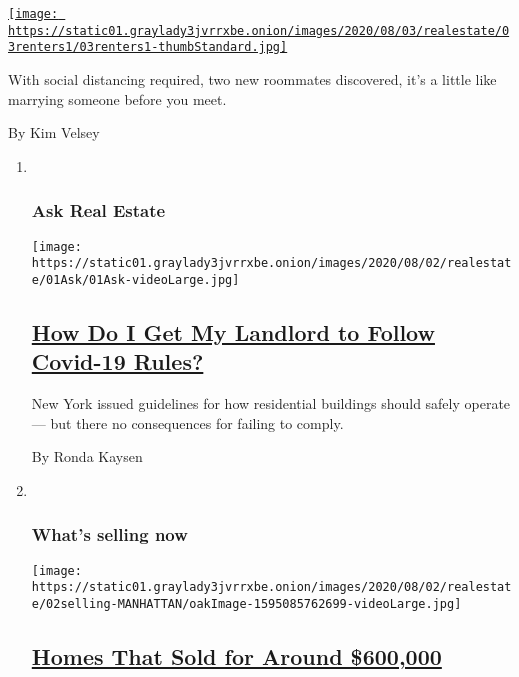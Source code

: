 \begin{enumerate}
\begin{enumerate}
    \href{/2020/08/03/realestate/coronavirus-roommate-renters.html}{\texttt{[image: https://static01.graylady3jvrrxbe.onion/images/2020/08/03/realestate/03renters1/03renters1-thumbStandard.jpg]}}

    With social distancing required, two new roommates discovered, it's
    a little like marrying someone before you meet.

    By Kim Velsey
  \end{enumerate}
\end{enumerate}

\begin{enumerate}
\def\labelenumi{\arabic{enumi}.}
\item ~
  \hypertarget{ask-real-estate}{%
  \subsubsection{Ask Real Estate}\label{ask-real-estate}}

  \texttt{[image: https://static01.graylady3jvrrxbe.onion/images/2020/08/02/realestate/01Ask/01Ask-videoLarge.jpg]}

  \hypertarget{how-do-i-get-my-landlord-to-follow-covid-19-rules}{%
  \subsection{\texorpdfstring{\href{/2020/08/01/realestate/coronavirus-covid-apartment-buildings.html}{How
  Do I Get My Landlord to Follow Covid-19
  Rules?}}{How Do I Get My Landlord to Follow Covid-19 Rules?}}\label{how-do-i-get-my-landlord-to-follow-covid-19-rules}}

  New York issued guidelines for how residential buildings should safely
  operate --- but there no consequences for failing to comply.

  By Ronda Kaysen
\item ~
  \hypertarget{whats-selling-now}{%
  \subsubsection{What's selling now}\label{whats-selling-now}}

  \texttt{[image: https://static01.graylady3jvrrxbe.onion/images/2020/08/02/realestate/02selling-MANHATTAN/oakImage-1595085762699-videoLarge.jpg]}

  \hypertarget{homes-that-sold-for-around-600000}{%
  \subsection{\texorpdfstring{\href{/2020/08/02/realestate/homes-that-sold-for-around-600000.html}{Homes
  That Sold for Around
  \$600,000}}{Homes That Sold for Around \$600,000}}\label{homes-that-sold-for-around-600000}}


\end{enumerate}
